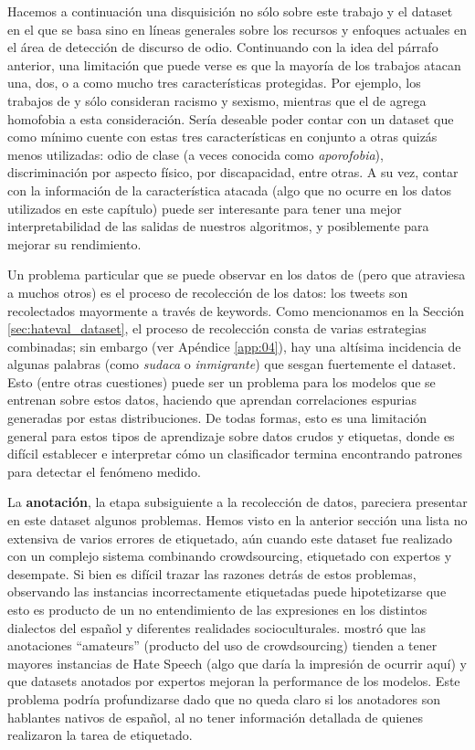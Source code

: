 Hacemos a continuación una disquisición no sólo sobre este trabajo y el dataset en el que se basa sino en líneas generales sobre los recursos y enfoques actuales en el área de detección de discurso de odio. Continuando con la idea del párrafo anterior, una limitación que puede verse es que la mayoría de los trabajos atacan una, dos, o a como mucho tres características protegidas. Por ejemplo, los trabajos de \citet{waseem2016hateful} y \citet{hateval2019semeval} sólo consideran racismo y sexismo, mientras que el de \citet{Davidson2017AutomatedHS} agrega homofobia a esta consideración. Sería deseable poder contar con un dataset que como mínimo cuente con estas tres características en conjunto a otras quizás menos utilizadas: odio de clase (a veces conocida como \emph{aporofobia}), discriminación por aspecto físico, por discapacidad, entre otras. A su vez, contar con la información de la característica atacada (algo que no ocurre en los datos utilizados en este capítulo) puede ser interesante para tener una mejor interpretabilidad de las salidas de nuestros algoritmos, y posiblemente para mejorar su rendimiento.

Un problema particular que se puede observar en los datos de \citet{hateval2019semeval} (pero que atraviesa a muchos otros) es el proceso de recolección de los datos: los tweets son recolectados mayormente a través de keywords. Como mencionamos en la Sección \ref{sec:hateval_dataset}, el proceso de recolección consta de varias estrategias combinadas; sin embargo (ver Apéndice \ref{app:04}), hay una altísima incidencia de algunas palabras (como \emph{sudaca} o \emph{inmigrante}) que sesgan fuertemente el dataset. Esto (entre otras cuestiones) puede ser un problema para los modelos que se entrenan sobre estos datos, haciendo que aprendan correlaciones espurias generadas por estas distribuciones. De todas formas, esto es una limitación general para estos tipos de aprendizaje sobre datos crudos y etiquetas, donde es difícil establecer e interpretar cómo un clasificador termina encontrando patrones para detectar el fenómeno medido.

La \textbf{anotación}, la etapa subsiguiente a la recolección de datos, pareciera presentar en este dataset algunos problemas. Hemos visto en la anterior sección una lista no extensiva de varios errores de etiquetado, aún cuando este dataset fue realizado con un complejo sistema combinando crowdsourcing,  etiquetado con expertos y desempate. Si bien es difícil trazar las razones detrás de estos problemas, observando las instancias incorrectamente etiquetadas puede hipotetizarse que esto es producto de un no entendimiento de las expresiones en los distintos dialectos del español y diferentes realidades socioculturales. \citet{waseem-2016-racist} mostró que las anotaciones ``amateurs'' (producto del uso de crowdsourcing) tienden a tener mayores instancias de Hate Speech (algo que daría la impresión de ocurrir aquí) y que datasets anotados por expertos mejoran la performance de los modelos. Este problema podría profundizarse dado que no queda claro si los anotadores son hablantes nativos de español, al no tener información detallada de quienes realizaron la tarea de etiquetado.

